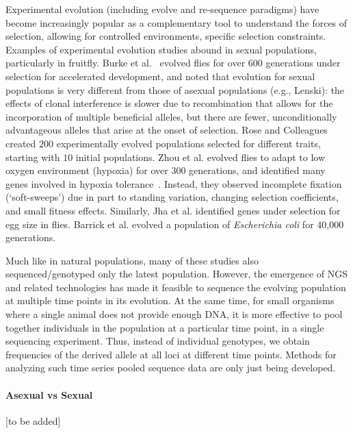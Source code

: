 \documentclass[11pt]{article}
\begin{document}
Experimental evolution (including evolve and re-sequence paradigms)
have become increasingly popular as a complementary tool to understand
the forces of selection, allowing for controlled environments,
specific selection constraints. Examples of experimental evolution
studies abound in sexual populations, particularly in fruitfly. Burke
et al.~\cite{Barrick2013Genome} evolved flies for over $600$ generations 
under
selection for accelerated development, and noted that evolution for
sexual populations is very different from those of asexual populations
(e.g., Lenski): the effects of clonal interference is slower
due to recombination that allows for the incorporation of multiple
beneficial alleles, but there are fewer, unconditionally advantageous
alleles that arise at the onset of selection. Rose and
Colleagues~\cite{rose1994evolutionary} created $200$ experimentally evolved
populations selected for different traits, starting with $10$ initial
populations. Zhou et al. evolved flies to adapt to low oxygen
environment (hypoxia) for over $300$ generations, and identified many
genes involved in hypoxia tolerance~\cite{zhou2011experimental}.  Instead, 
they observed
incomplete fixation (`soft-sweeps') due in part to standing variation,
changing selection coefficients, and small fitness effects. Similarly, Jha et
 al. \cite{jha2015whole} identified genes under selection for egg size in flies.
Barrick et al. \cite{barrick2009genome} evolved a population of 
\emph{Escherichia coli} for 40,000 generations.

Much like in natural populations, many of these studies also
sequenced/genotyped only the latest population. However, the emergence
of NGS and related technologies has made it feasible to sequence the
evolving population at multiple time points in its evolution. At the
same time, for small organisms where a single animal does not provide
enough DNA, it is more effective to pool together individuals in the
population at a particular time point, in a single sequencing
experiment. Thus, instead of individual genotypes, we obtain
frequencies of the derived allele at all loci at different time
points. Methods for analyzing such time series pooled sequence data
are only just being developed.

\paragraph{Asexual vs Sexual}
\cite{bollback2008estimation,lenski1991long,lang2013pervasive} [to be 
added]
\end{document}
